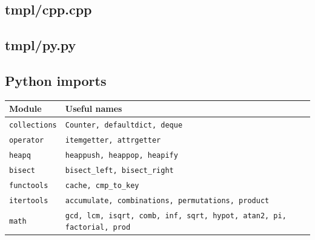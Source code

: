 \columnbreak
\par\noindent\begin{minipage}{\linewidth}
\subsection{tmpl/cpp.cpp}\label{setup:cpp}

\end{minipage}\par

\par\noindent\begin{minipage}{\linewidth}
\subsection{tmpl/py.py}\label{setup:python}

\end{minipage}\par
{}

\par\noindent\begin{minipage}{\linewidth}
\subsection{Python imports}\label{setup:imports}
{\fontsize{7.5}{8.5}\selectfont
\setlength{\tabcolsep}{3pt}
\renewcommand{\arraystretch}{1.15}
\begin{tabularx}{\linewidth}{@{}l>{\raggedright\arraybackslash}X@{}}
\toprule
\textbf{Module} & \textbf{Useful names} \\
\midrule
\texttt{collections} & \texttt{Counter, defaultdict, deque} \\
\texttt{operator} & \texttt{itemgetter, attrgetter} \\
\texttt{heapq} & \texttt{heappush, heappop, heapify} \\
\texttt{bisect} & \texttt{bisect\_left, bisect\_right} \\
\texttt{functools} & \texttt{cache, cmp\_to\_key} \\
\texttt{itertools} & \texttt{accumulate, combinations, permutations, product} \\
\texttt{math} & \texttt{gcd, lcm, isqrt, comb, inf, sqrt, hypot, atan2, pi, factorial, prod} \\
\bottomrule
\end{tabularx}}
\end{minipage}\par
